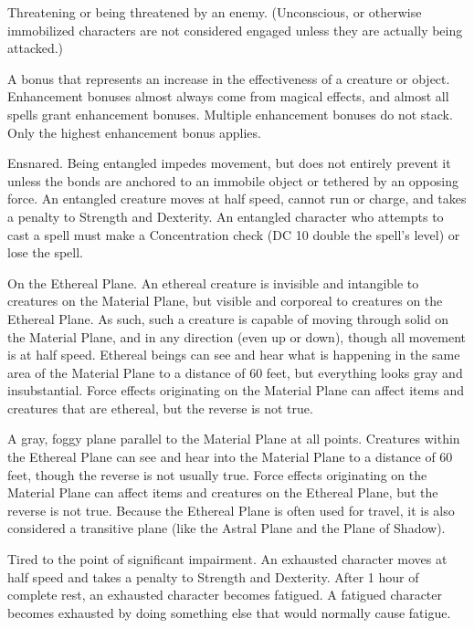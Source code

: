  Threatening or being threatened by an enemy. 
(Unconscious, or otherwise immobilized characters are not considered engaged unless they are actually being attacked.) 

 A bonus that represents an increase in the effectiveness of a creature or object. Enhancement bonuses almost always come from magical effects, and almost all spells grant enhancement bonuses. Multiple enhancement bonuses do not stack. Only the highest enhancement bonus 
applies.

 Ensnared. Being entangled impedes movement, but 
does not entirely prevent it unless the bonds are anchored to an 
immobile object or tethered by an opposing force. An entangled 
creature moves at half speed, cannot run or charge, and takes a  
penalty to Strength and Dexterity. An entangled character who attempts to cast a spell must make a Concentration check (DC 10 \add double the spell's level) or lose the spell.

 On the Ethereal Plane. An ethereal creature is invisible 
and intangible to creatures on the Material Plane, but visible and 
corporeal to creatures on the Ethereal Plane. As such, such a 
creature is capable of moving through solid on the Material Plane, 
and in any direction (even up or down), though all movement is at 
half speed. Ethereal beings can see and hear what is happening in 
the same area of the Material Plane to a distance of 60 feet, but 
everything looks gray and insubstantial. Force effects originating on 
the Material Plane can affect items and creatures that are ethereal, 
but the reverse is not true. 

 A gray, foggy plane parallel to the Material Plane 
at all points. Creatures within the Ethereal Plane can see and hear 
into the Material Plane to a distance of 60 feet, though the reverse is 
not usually true. Force effects originating on the Material Plane can 
affect items and creatures on the Ethereal Plane, but the reverse is 
not true. Because the Ethereal Plane is often used for travel, it is also 
considered a transitive plane (like the Astral Plane and the Plane of 
Shadow). 

 Tired to the point of significant impairment. An 
exhausted character moves at half speed and takes a  penalty to 
Strength and Dexterity. After 1 hour of complete rest, an exhausted 
character becomes fatigued. A fatigued character becomes exhausted 
by doing something else that would normally cause fatigue. 

